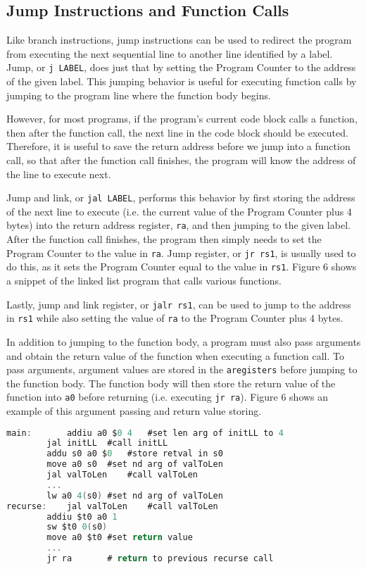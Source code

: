 \documentclass{article}
\begin{document}
\subsection{Jump Instructions and Function Calls}
Like branch instructions, jump instructions can be used to redirect the program from executing the next sequential line to another line identified by a label. Jump, or \texttt{j LABEL}, does just that by setting the Program Counter to the address of the given label. This jumping behavior is useful for executing function calls by jumping to the program line where the function body begins.

However, for most programs, if the program's current code block calls a function, then after the function call, the next line in the code block should be executed. Therefore, it is useful to save the return address before we jump into a function call, so that after the function call finishes, the program will know the address of the line to execute next. 

Jump and link, or \texttt{jal LABEL}, performs this behavior by first storing the address of the next line to execute (i.e. the current value of the Program Counter plus 4 bytes) into the return address register, \texttt{ra}, and then jumping to the given label. After the function call finishes, the program then simply needs to set the Program Counter to the value in \texttt{ra}. Jump register, or \texttt{jr rs1}, is usually used to do this, as it sets the Program Counter equal to the value in \texttt{rs1}.  Figure 6 shows a snippet of the linked list program that calls various functions.

Lastly, jump and link register, or \texttt{jalr rs1}, can be used to jump to the address in \texttt{rs1} while also setting the value of \texttt{ra} to the Program Counter plus 4 bytes.

In addition to jumping to the function body, a program must also pass arguments and obtain the return value of the function when executing a function call. To pass arguments, argument values are stored in the \texttt{aregisters} before jumping to the function body. The function body will then store the return value of the function into \texttt{a0} before returning (i.e. executing \texttt{jr ra}). Figure 6 shows an example of this argument passing and return value storing.
\begin{center}
\renewcommand{\ttdefault}{pcr}
\begin{lstlisting}[language=C, basicstyle=\ttfamily, keywordstyle=\bfseries, showstringspaces=false, morekeywords={jal, addu, move, bne, j, sw, addiu, lw, jr}]
main:		addiu a0 $0 4	#set len arg of initLL to 4
		jal initLL	#call initLL
		addu s0 a0 $0	#store retval in s0
		move a0 s0	#set nd arg of valToLen
		jal valToLen	#call valToLen
		...
		lw a0 4(s0)	#set nd arg of valToLen
recurse:	jal valToLen	#call valToLen
		addiu $t0 a0 1
		sw $t0 0(s0)
		move a0 $t0	#set return value
		...
		jr ra		# return to previous recurse call
\end{lstlisting}
\end{center}
\end{document}
